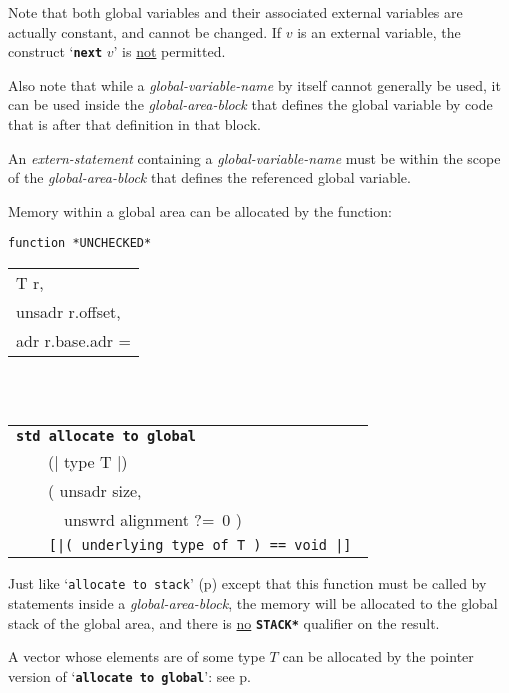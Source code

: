 \documentclass[12pt]{article}
\makeatletter
\newcommand{\TT}[1]{{\tt \bfseries #1}}
\newcommand{\ttstdkey}[1]{\TT{std #1}\index{#1@{\tt std #1}}}
\newcommand{\pagref}[1]{p\pageref{#1}}
\newcommand{\TS}{\hspace*{0in}\tt}
\newenvironment{indpar}[1][0.3in]%
	{\begin{list}{}%
		     {\setlength{\itemsep}{0in}%
		      \setlength{\topsep}{0in}%
		      \setlength{\parsep}{1ex}%
		      \setlength{\labelwidth}{#1}%
		      \setlength{\leftmargin}{#1}%
		      \addtolength{\leftmargin}{\labelsep}}%
	 \item}%
	{\end{list}}
\makeatother
\begin{document}
Note that both global variables and their associated external variables
are actually constant, and cannot be changed.  If $v$ is an external
variable, the construct `\TT{next} $v$' is \underline{not} permitted.

Also note that while a {\em global-variable-name} by itself cannot
generally be used, it can be used inside the {\em global-area-block}
that defines the global variable by code that is after that definition
in that block.

An {\em extern-statement} containing a {\em global-variable-name}
must be within the scope of the {\em global-area-block} that defines
the referenced global variable.

Memory within a global area can be allocated by the function:

\begin{indpar}

{\tt function *UNCHECKED* \begin{tabular}[t]{@{}l@{}}
                                  T r, \\
				  unsadr r.offset, \\
				  adr r.base.adr = \\
				  \end{tabular} \\
\TS~~~~\begin{tabular}[t]{@{}l@{}}
       \ttstdkey{allocate to global} \label{ALLOCATE-TO-GLOBAL} \\
       ~~~~(| type T |) \\
       ~~~~( unsadr size, \\
       ~~~~~~unswrd alignment ?=~0 ) \\
\TS~~~~[|( underlying type of T ) == void |] \\
       \end{tabular}}

\begin{indpar}
Just like `{\tt allocate to stack}' (\pagref{ALLOCATE-TO-STACK})
except that this function must be called by statements inside
a {\em global-area-block}, the memory will be allocated to the global stack
of the global area,
and there is \underline{no} \TT{*STACK*} qualifier on the result.


\end{indpar}

\end{indpar}

A vector whose elements are of some type $T$ can be allocated by
the pointer version of `\TT{allocate to global}': see
\pagref{POINTER-ALLOCATE-TO-GLOBAL}.
\end{document}
